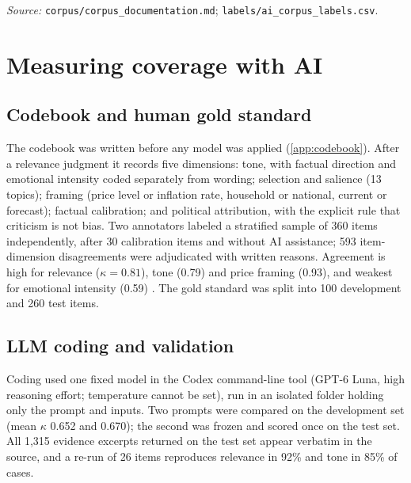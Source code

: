\documentclass[11pt]{article}
\begin{document}
\begin{table}[htbp]
\begin{threeparttable}
\begin{tablenotes}[flushleft]
\item \textit{Source:} \texttt{corpus/corpus\_documentation.md}; \texttt{labels/ai\_corpus\_labels.csv}.
\end{tablenotes}
\end{threeparttable}
\end{table}

\section{Measuring coverage with AI}\label{sec:measure}

\subsection{Codebook and human gold standard}
The codebook was written before any model was applied (\cref{app:codebook}). After a relevance judgment it records five dimensions: tone, with factual direction and emotional intensity coded separately from wording; selection and salience (13 topics); framing (price level or inflation rate, household or national, current or forecast); factual calibration; and political attribution, with the explicit rule that criticism is not bias. Two annotators labeled a stratified sample of 360 items independently, after 30 calibration items and without AI assistance; 593 item-dimension disagreements were adjudicated with written reasons. Agreement is high for relevance ($\kappa = 0.81$), tone (0.79) and price framing (0.93), and weakest for emotional intensity (0.59) \citep{cohen1960}. The gold standard was split into 100 development and 260 test items.

\subsection{LLM coding and validation}
Coding used one fixed model in the Codex command-line tool (GPT-6 Luna, high reasoning effort; temperature cannot be set), run in an isolated folder holding only the prompt and inputs. Two prompts were compared on the development set (mean $\kappa$ 0.652 and 0.670); the second was frozen and scored once on the test set. All 1,315 evidence excerpts returned on the test set appear verbatim in the source, and a re-run of 26 items reproduces relevance in 92\% and tone in 85\% of cases.
\end{document}
